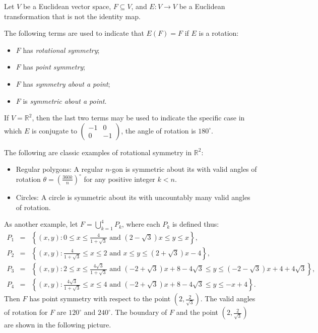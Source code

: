 \documentclass[12pt]{article}
\begin{document}

Let $V$ be a Euclidean vector space, $F \subseteq V$, and $E \colon V \to V$ be a Euclidean transformation that is not the identity map.

The following terms are used to indicate that $E(F)=F$ if $E$ is a rotation:

\begin{itemize}
\item $F$ has \emph{rotational symmetry};
\item $F$ has \emph{point symmetry};
\item $F$ has \emph{symmetry about a point};
\item $F$ is \emph{symmetric about a point}.
\end{itemize}

If $V=\mathbb{R}^2$, then the last two terms may be used to indicate the specific case in which $E$ is conjugate to $\displaystyle \left( \begin{array}{rr}
-1 & 0 \\
0 & -1 \end{array} \right)$,  the angle of rotation is $180^{\circ}$.

The following are classic examples of rotational symmetry in $\mathbb{R}^2$:

\begin{itemize}
\item Regular polygons: A regular $n$-gon is symmetric about its  with valid angles of rotation $\displaystyle \theta=\left( \frac{360k}{n} \right)^{\circ}$ for any positive integer $k<n$.
\item Circles: A circle is symmetric about its  with uncountably many valid angles of rotation.
\end{itemize}

As another example, let $\displaystyle F=\bigcup_{k=1}^4 P_k$, where each $P_k$ is defined thus:
\begin{eqnarray*}
\displaystyle P_1&=&\left\{ (x,y) : 0 \le x \le \frac{4}{1+\sqrt{3}} \text{ and } (2-\sqrt{3})x \le y \le x \right\},\\ \displaystyle P_2&=&\left\{ (x,y) : \frac{4}{1+\sqrt{3}} \le x \le 2 \text{ and } x \le y \le (2+\sqrt{3})x-4 \right\},\\
\displaystyle P_3&=&\left\{ (x,y) : 2 \le x \le \frac{4 \sqrt{3}}{1+\sqrt{3}} \text{ and } (-2+\sqrt{3})x+8-4\sqrt{3} \le y \le (-2-\sqrt{3})x+4+4\sqrt{3} \right\},\\
\displaystyle P_4&=&\left\{ (x,y) : \frac{4 \sqrt{3}}{1+\sqrt{3}} \le x \le 4 \text{ and } (-2+\sqrt{3})x+8-4\sqrt{3} \le y \le -x+4 \right\}. 
\end{eqnarray*}
Then $F$ has point symmetry with respect to the point $\displaystyle \left( 2, \frac{2}{\sqrt{3}} \right)$.  The valid angles of rotation for $F$ are $120^{\circ}$ and $240^{\circ}$.  The boundary of $F$ and the point $\displaystyle \left( 2, \frac{2}{\sqrt{3}} \right)$ are shown in the following picture.
\end{document}
